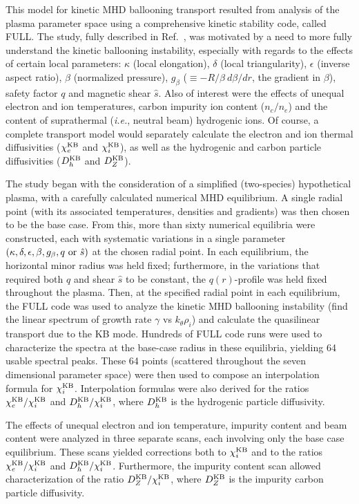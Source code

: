 This model for kinetic MHD ballooning transport resulted from analysis of the
plasma parameter space using a comprehensive kinetic stability code,
called FULL\cite{rewoldt98,rewoldt87,rewoldt82}.
The study, fully described in Ref.~\cite{reddthes}, was motivated by
a need to more fully understand the kinetic ballooning instability,
especially with regards to the effects of certain local parameters:
$\kappa$ (local elongation), $\delta$ (local triangularity),
$\epsilon$ (inverse aspect ratio), $\beta$ (normalized pressure),
$g_\beta$ ($\equiv -R/\beta~d\beta/dr$, the gradient in $\beta$),
safety factor $q$ and magnetic shear $\hat{s}$.
Also of interest were the effects of unequal electron and ion temperatures,
carbon impurity ion content ($n_c/n_e$) and the content of suprathermal
({\it i.e.}, neutral beam) hydrogenic ions.
Of course, a complete transport model would separately calculate the
electron and ion thermal diffusivities ($\chi_e^{\rm KB}$ and
$\chi_i^{\rm KB}$), as well as the hydrogenic and carbon particle
diffusivities ($D_h^{\rm KB}$ and $D_Z^{\rm KB}$).

The study began with the consideration of a simplified (two-species)
hypothetical plasma, with a carefully calculated numerical MHD equilibrium.
A single radial point (with its associated temperatures, densities and
gradients) was then chosen to be the base case.
From this, more than sixty numerical equilibria were constructed, each with
systematic variations in a single parameter
$(\kappa, \delta, \epsilon, \beta, g_\beta, q~{\rm or}~\hat{s})$
at the chosen radial point.
In each equilibrium, the horizontal minor radius was held fixed; furthermore,
in the variations that required both $q$ and shear $\hat{s}$ to be constant,
the $q(r)$-profile was held fixed throughout the plasma.
Then, at the specified radial point in each equilibrium, the FULL code was
used to analyze the kinetic MHD ballooning instability (find the linear
spectrum of growth rate $\gamma$ vs $k_\theta \rho_i$) and calculate the
quasilinear transport due to the KB mode.
Hundreds of FULL code runs were used to characterize the spectra at the
base-case radius in these equilibria, yielding 64 usable spectral peaks.
These 64 points (scattered throughout the seven dimensional parameter space)
were then used to compose an interpolation formula for $\chi_i^{\rm KB}$.
Interpolation formulas were also derived for the ratios
$\chi_e^{\rm KB}/\chi_i^{\rm KB}$ and $D_h^{\rm KB}/\chi_i^{\rm KB}$,
where $D_h^{\rm KB}$ is the hydrogenic particle diffusivity.

The effects of unequal electron and ion temperature, impurity content and
beam content were analyzed in three separate scans, each involving only
the base case equilibrium.
These scans yielded corrections both to $\chi_i^{\rm KB}$ and to the
ratios $\chi_e^{\rm KB}/\chi_i^{\rm KB}$ and $D_h^{\rm KB}/\chi_i^{\rm KB}$.
Furthermore, the impurity content scan allowed characterization of the ratio
$D_Z^{\rm KB}/\chi_i^{\rm KB}$, where $D_Z^{\rm KB}$ is the impurity carbon
particle diffusivity.

